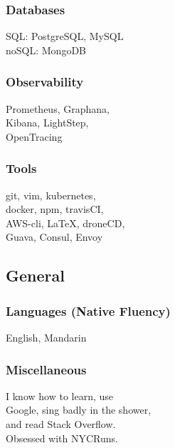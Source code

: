 \documentclass[]{two-column-resume}
\begin{document}
\begin{minipage}[t]{0.34\textwidth}
\subsubsection{Databases}
SQL: PostgreSQL, MySQL\\
noSQL: MongoDB
\newline

\subsubsection{Observability}
Prometheus, Graphana,\\
Kibana, LightStep,\\
OpenTracing
\newline

\subsubsection{Tools}
git, vim, kubernetes,\\
docker, npm, travisCI,\\
AWS-cli, \LaTeX, droneCD,\\
Guava, Consul, Envoy\\

\sectionsep

\subsection{General}
\subsubsection{Languages (Native Fluency)}
English, Mandarin
\newline

\subsubsection{Miscellaneous}
I know how to learn, use\\
Google, sing badly in the shower, \\
and read Stack Overflow.\\
Obsessed with NYCRuns.
\setlength{\parindent}{0ex}

\sectionsep



\end{minipage}
\end{document}
